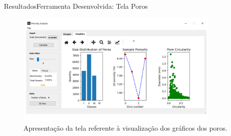 \documentclass{beamer}
\begin{document}
\begin{frame}{Resultados}{Ferramenta Desenvolvida: Tela Poros}
    
    \begin{figure}[!htb]
    \centering
    \includegraphics[width=10cm]{fig/tela-poro-2.pdf}\\
    \scriptsize{Apresentação da tela referente à visualização dos gráficos dos poros.}
    \end{figure}
\end{frame}
\end{document}
